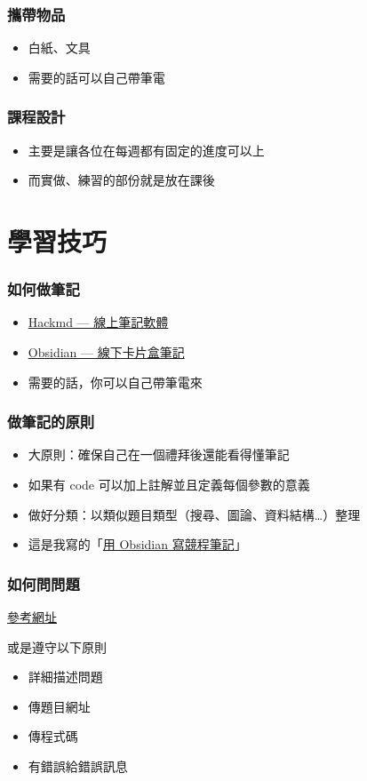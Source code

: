 \documentclass[mathserif]{beamer}
\begin{document}
\begin{frame}
    \frametitle{攜帶物品}
    \begin{itemize}
        \item 白紙、文具
        \item 需要的話可以自己帶筆電
    \end{itemize}
\end{frame}

\begin{frame}
    \frametitle{課程設計}
    \begin{itemize}
        \item 主要是讓各位在每週都有固定的進度可以上
        \item 而實做、練習的部份就是放在課後
    \end{itemize}
\end{frame}

\section{學習技巧}

\begin{frame}
    \frametitle{如何做筆記}
    \begin{itemize}
        \item \href{https://hackmd.io/?nav=overview}{Hackmd — 線上筆記軟體}
        \item \href{https://youtu.be/Egj_DdGUIDI}{Obsidian — 線下卡片盒筆記}
        \vspace{0.5cm}
        \item 需要的話，你可以自己帶筆電來
    \end{itemize}
\end{frame}

\begin{frame}
    \frametitle{做筆記的原則}
    \begin{itemize}
        \item 大原則：確保自己在一個禮拜後還能看得懂筆記
        \item 如果有 code 可以加上註解並且定義每個參數的意義
        \item 做好分類：以類似題目類型（搜尋、圖論、資料結構…）整理
        \vspace{0.5cm}
        \item 這是我寫的「\href{https://hackmd.io/@temmie950807/rJL9TfXpj}{用 Obsidian 寫競程筆記}」
    \end{itemize}
\end{frame}

\begin{frame}
    \frametitle{如何問問題}
    \href{https://github.com/ryanhanwu/How-To-Ask-Questions-The-Smart-Way}{參考網址}
    
    \vspace{0.5cm}
    或是遵守以下原則
    \begin{itemize}
        \item 詳細描述問題
        \item 傳題目網址
        \item 傳程式碼
        \item 有錯誤給錯誤訊息
    \end{itemize}
\end{frame}
\end{document}
